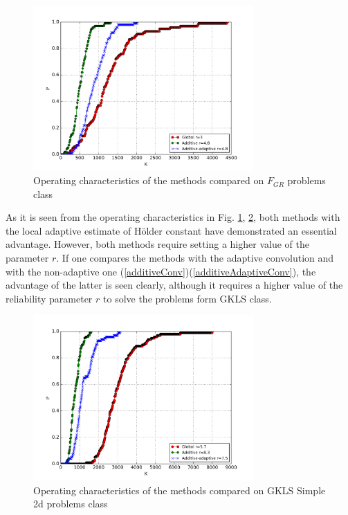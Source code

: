 \documentclass[procedia]{easychair}
\begin{document}
\par
\begin{figure}[ht]
  	\center
    \includegraphics[width=0.75\textwidth]{images/grishagin.png}
    \caption{Operating characteristics of the methods compared on \(F_{GR}\) problems class}
    \label{fig:grishh_op}
  \end{figure}
As it is seen from the operating characteristics in Fig. \ref{fig:grishh_op}, \ref{fig:gkls_op}, both methods with the
local adaptive estimate of Hölder constant have demonstrated an essential advantage.
However, both methods require setting a higher value of the parameter \(r\). If one compares the
methods with the adaptive convolution and  with the non-adaptive one (\ref{additiveConv})(\ref{additiveAdaptiveConv}), the advantage
of the latter is seen clearly, although it requires a higher value of the reliability
parameter \(r\) to solve the problems form GKLS class.
  \begin{figure}[ht]
  	\center
    \includegraphics[width=0.75\textwidth]{images/gkls-s.png}
    \caption{Operating characteristics of the methods compared on GKLS Simple 2d problems class}
    \label{fig:gkls_op}
  \end{figure}
\end{document}
